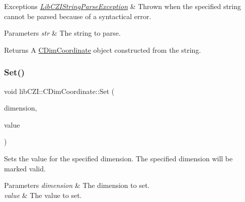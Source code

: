 \begin{DoxyExceptions}{Exceptions}
{\em \hyperlink{classlib_c_z_i_1_1_lib_c_z_i_string_parse_exception}{Lib\+C\+Z\+I\+String\+Parse\+Exception}} & Thrown when the specified string cannot be parsed because of a syntactical error.\\
\hline
\end{DoxyExceptions}

\begin{DoxyParams}{Parameters}
{\em str} & The string to parse.\\
\hline
\end{DoxyParams}
\begin{DoxyReturn}{Returns}
A \hyperlink{classlib_c_z_i_1_1_c_dim_coordinate}{C\+Dim\+Coordinate} object constructed from the string. 
\end{DoxyReturn}
\mbox{\label{classlib_c_z_i_1_1_c_dim_coordinate_a9f6d967df6c2040e395c0710e8374909}} 
\subsubsection{\texorpdfstring{Set()}{Set()}}
{\footnotesize\ttfamily void lib\+C\+Z\+I\+::\+C\+Dim\+Coordinate\+::\+Set (\begin{DoxyParamCaption}\item[{\hyperlink{namespacelib_c_z_i_a55049658acf59d0eddfaebcad16df424}{lib\+C\+Z\+I\+::\+Dimension\+Index}}]{dimension,  }\item[{int}]{value }\end{DoxyParamCaption})\hspace{0.3cm}{\ttfamily [inline]}}

Sets the value for the specified dimension. The specified dimension will be marked \textquotesingle{}valid\textquotesingle{}.


\begin{DoxyParams}{Parameters}
{\em dimension} & The dimension to set. \\
\hline
{\em value} & The value to set. \\
\hline
\end{DoxyParams}
\mbox{\label{classlib_c_z_i_1_1_c_dim_coordinate_af7bc7e775a5971d46550e45ebf2b2ba7}} 
